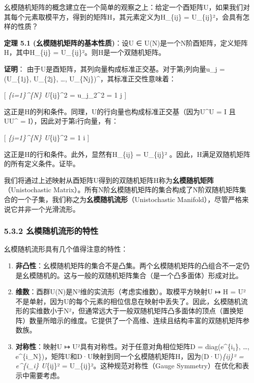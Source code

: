 \documentclass[
  12pt,
]{article}
\providecommand{\tightlist}{%
  \setlength{\itemsep}{0pt}\setlength{\parskip}{0pt}}
\begin{document}
幺模随机矩阵的概念建立在一个简单的观察之上：给定一个酉矩阵U，如果我们对其每个元素取模平方，得到的矩阵H，其元素定义为H\_\{ij\}
= \textbar U\_\{ij\}\textbar²，会具有怎样的性质？

\textbf{定理 5.1 (幺模随机矩阵的基本性质)}：设U ∈
U(N)是一个N阶酉矩阵，定义矩阵H，其中H\_\{ij\} =
\textbar U\_\{ij\}\textbar²。则H是一个双随机矩阵。

\textbf{证明}： 由于U是酉矩阵，其列向量构成标准正交基。对于第j列向量u\_j
= (U\_\{1j\}, U\_\{2j\}, \ldots, U\_\{Nj\})^{}，其标准正交性意味着：

{[} \sum\emph{\{i=1\}\^{}\{N\} \textbar U}\{ij\}\textbar\^{}2 =
\textbar u\_j\textbar\_2\^{}2 = 1 \quad \forall j {]}

这正是H的列和条件。同理，U的行向量也构成标准正交基（因为U^{\dagger}U = I 且 UU^{\dagger} =
I），因此对于第i行向量，有：

{[} \sum\emph{\{j=1\}\^{}\{N\} \textbar U}\{ij\}\textbar\^{}2 = 1
\quad \forall i {]}

这正是H的行和条件。此外，显然有H\_\{ij\} = \textbar U\_\{ij\}\textbar² 。因此，H满足双随机矩阵的所有定义条件。证毕。

我们将通过上述映射从酉矩阵U得到的双随机矩阵H称为\textbf{幺模随机矩阵}（Unistochastic
Matrix）。所有N阶幺模随机矩阵的集合构成了N阶双随机矩阵集合的一个子集，我们称之为\textbf{幺模随机流形}（Unistochastic
Manifold），尽管严格来说它并非一个光滑流形。

\hypertarget{ux5e7aux6a21ux968fux673aux6d41ux5f62ux7684ux7279ux6027}{%
\subsubsection{5.3.2
幺模随机流形的特性}\label{ux5e7aux6a21ux968fux673aux6d41ux5f62ux7684ux7279ux6027}}

幺模随机流形具有几个值得注意的特性：

\begin{enumerate}
\def\labelenumi{\arabic{enumi}.}
\tightlist
\item
  \textbf{非凸性}：幺模随机矩阵的集合不是凸集。两个幺模随机矩阵的凸组合不一定仍是幺模随机的。这与一般的双随机矩阵集合（是一个凸多面体）形成对比。
\item
  \textbf{维数}：酉群U(N)是N²维的实流形（考虑实维数）。取模平方映射U ↦ H
  =
  \textbar U\textbar²不是单射，因为U的每个元素的相位信息在映射中丢失了。因此，幺模随机流形的实维数小于N²，但通常远大于一般双随机矩阵凸多面体的顶点（置换矩阵）数量所暗示的维度。它提供了一个高维、连续且结构丰富的双随机矩阵参数族。
\item
  \textbf{对称性}：映射U ↦
  \textbar U\textbar²具有对称性。对于任意对角相位矩阵D =
  diag(e\^{}\{i\theta₁\}, \ldots,
  e\^{}\{i\theta\_N\})，矩阵U和D·U映射到同一个幺模随机矩阵H，因为\textbar(D·U)\emph{\{ij\}\textbar²
  = \textbar e\^{}\{i\theta\_i\} U}\{ij\}\textbar² =
  \textbar U\_\{ij\}\textbar²。这种规范对称性（Gauge
  Symmetry）在优化和表示中需要考虑。
\end{enumerate}
\end{document}

